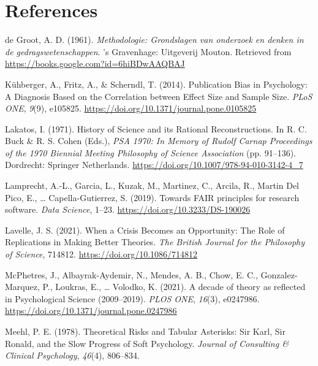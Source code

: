 \documentclass[
  man]{apa6}
\newlength{\cslhangindent}
\newenvironment{CSLReferences}[2] %
 {\begin{list}{}{%
  \setlength{\itemindent}{0pt}
  \setlength{\leftmargin}{0pt}
  \setlength{\parsep}{0pt}
  \ifodd #1
   \setlength{\leftmargin}{\cslhangindent}
   \setlength{\itemindent}{-1\cslhangindent}
  \fi
  \setlength{\itemsep}{#2\baselineskip}}}
 {\end{list}}
\begin{document}
\newpage

\section{References}\label{references}

\label{refs}
\begin{CSLReferences}{1}{0}
de Groot, A. D. (1961). \emph{Methodologie: Grondslagen van onderzoek en denken in de gedragswetenschappen}. 's Gravenhage: Uitgeverij Mouton. Retrieved from \url{https://books.google.com?id=6hiBDwAAQBAJ}

Kühberger, A., Fritz, A., \& Scherndl, T. (2014). Publication {Bias} in {Psychology}: {A Diagnosis Based} on the {Correlation} between {Effect Size} and {Sample Size}. \emph{PLoS ONE}, \emph{9}(9), e105825. \url{https://doi.org/10.1371/journal.pone.0105825}

Lakatos, I. (1971). History of {Science} and its {Rational Reconstructions}. In R. C. Buck \& R. S. Cohen (Eds.), \emph{{PSA} 1970: {In Memory} of {Rudolf Carnap Proceedings} of the 1970 {Biennial Meeting Philosophy} of {Science Association}} (pp. 91--136). Dordrecht: Springer Netherlands. \url{https://doi.org/10.1007/978-94-010-3142-4_7}

Lamprecht, A.-L., Garcia, L., Kuzak, M., Martinez, C., Arcila, R., Martin Del Pico, E., \ldots{} Capella-Gutierrez, S. (2019). Towards {FAIR} principles for research software. \emph{Data Science}, 1--23. \url{https://doi.org/10.3233/DS-190026}

Lavelle, J. S. (2021). When a {Crisis Becomes} an {Opportunity}: {The Role} of {Replications} in {Making Better Theories}. \emph{The British Journal for the Philosophy of Science}, 714812. \url{https://doi.org/10.1086/714812}

McPhetres, J., Albayrak-Aydemir, N., Mendes, A. B., Chow, E. C., Gonzalez-Marquez, P., Loukras, E., \ldots{} Volodko, K. (2021). A decade of theory as reflected in {Psychological Science} (2009--2019). \emph{PLOS ONE}, \emph{16}(3), e0247986. \url{https://doi.org/10.1371/journal.pone.0247986}

Meehl, P. E. (1978). Theoretical {Risks} and {Tabular Asterisks}: {Sir Karl}, {Sir Ronald}, and the {Slow Progress} of {Soft Psychology}. \emph{Journal of Consulting \& Clinical Psychology}, \emph{46}(4), 806--834.


\end{CSLReferences}
\end{document}
